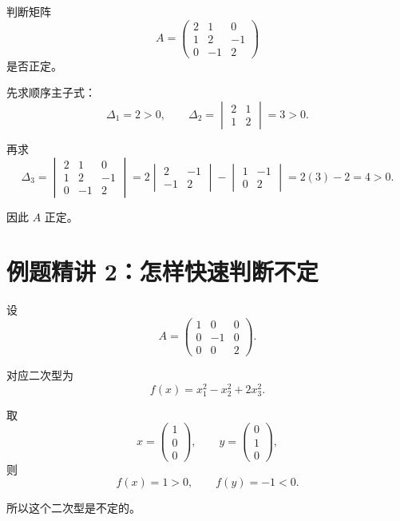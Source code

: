 \documentclass[11pt,oneside,UTF8]{ctexbook}
\begin{document}
\begin{examplebox}[例 10：顺序主子式判别]
判断矩阵
\[
A=
\begin{pmatrix}
2&1&0\\
1&2&-1\\
0&-1&2
\end{pmatrix}
\]
是否正定。

先求顺序主子式：
\[
\Delta_1=2>0,
\qquad
\Delta_2=
\begin{vmatrix}
2&1\\
1&2
\end{vmatrix}
=3>0.
\]

再求
\[
\Delta_3=
\begin{vmatrix}
2&1&0\\
1&2&-1\\
0&-1&2
\end{vmatrix}
=
2
\begin{vmatrix}
2&-1\\
-1&2
\end{vmatrix}
-
\begin{vmatrix}
1&-1\\
0&2
\end{vmatrix}
=2(3)-2=4>0.
\]

因此 \(A\) 正定。
\end{examplebox}

\section{例题精讲 2：怎样快速判断不定}

\begin{examplebox}[例 11：一眼看出不定]
设
\[
A=
\begin{pmatrix}
1&0&0\\
0&-1&0\\
0&0&2
\end{pmatrix}.
\]

对应二次型为
\[
f(x)=x_1^2-x_2^2+2x_3^2.
\]

取
\[
x=
\begin{pmatrix}
1\\0\\0
\end{pmatrix},
\qquad
y=
\begin{pmatrix}
0\\1\\0
\end{pmatrix},
\]
则
\[
f(x)=1>0,\qquad f(y)=-1<0.
\]

所以这个二次型是不定的。
\end{examplebox}
\end{document}
